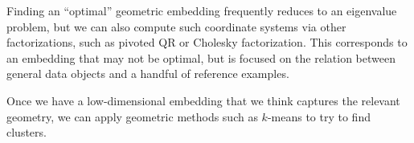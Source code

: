 \documentclass[12pt, leqno]{article} %
\begin{document}
Finding an ``optimal'' geometric embedding frequently reduces to an
eigenvalue problem, but we can also compute such coordinate systems
via other factorizations, such as pivoted QR or Cholesky
factorization.  This corresponds to an embedding that may not be
optimal, but is focused on the relation between general data objects
and a handful of reference examples.

Once we have a low-dimensional embedding that we think captures the
relevant geometry, we can apply geometric methods such as $k$-means
to try to find clusters.
\end{document}
